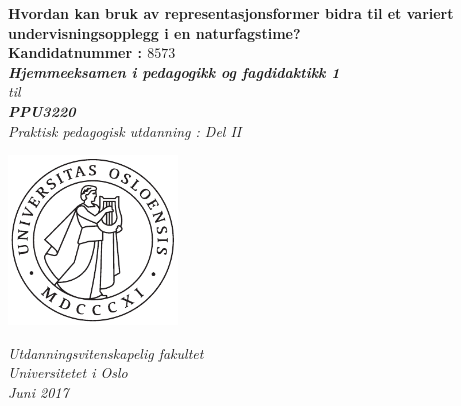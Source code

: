 \documentclass[main.tex]{subfiles}
\begin{document}
\thispagestyle{empty}
\begin{center}        %
  \vspace{5mm}        %
  \LARGE
  \textbf{Hvordan kan bruk av representasjonsformer bidra til et variert undervisningsopplegg i en naturfagstime?} \\
  \Large
  \vspace{10mm}
  \large
  \textbf{Kandidatnummer : $8573$} \\
  \vspace{20mm}
  \Large
  {\bf{\textsl{Hjemmeeksamen i pedagogikk og fagdidaktikk 1}}} \\
  \textsl{til} \\
  \vspace{2mm}
  {\bf{\textsl{PPU3220}}} \\
  \vspace{5mm}
  {\large \textsl {Praktisk pedagogisk utdanning : Del II}}\\
  \vspace{10mm}
  \centerline{\includegraphics[width=45mm,height=45mm]{../figures/uiosegl.pdf}} 
  \vspace{8mm}
  \textsl{Utdanningsvitenskapelig fakultet} \\
  \textsl{Universitetet i Oslo} \\
  \vspace{5mm}
  \large
  \textsl{Juni 2017} \\
  \vspace{2cm}


\end{center}
\end{document}
